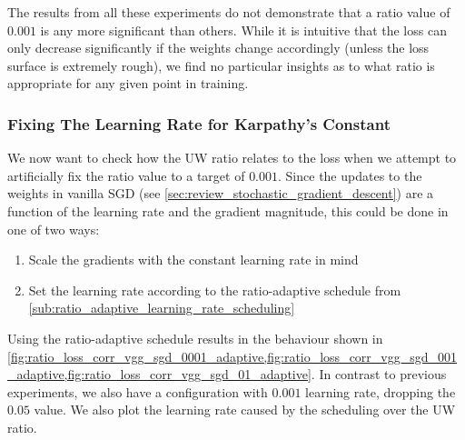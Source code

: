The results from all these experiments do not demonstrate that a ratio value
of $0.001$ is any more significant than others. While it is intuitive that the loss
can only decrease significantly if the weights change accordingly (unless the
loss surface is extremely rough), we find no particular insights as to what
ratio is appropriate for any given point in training.

\subsubsection{Fixing The Learning Rate for Karpathy's Constant}

We now want to check how the UW ratio relates to the loss when we attempt to
artificially fix the ratio value to a target of $0.001$. Since the updates to the
weights in vanilla SGD (see \cref{sec:review_stochastic_gradient_descent}) are a
function of the learning rate and the gradient magnitude, this could be done in
one of two ways:
\begin{enumerate}
    \item Scale the gradients with the constant learning rate in mind
    \item Set the learning rate according to the ratio-adaptive schedule from
        \cref{sub:ratio_adaptive_learning_rate_scheduling}
\end{enumerate}

Using the ratio-adaptive schedule results in the behaviour shown in
\cref{fig:ratio_loss_corr_vgg_sgd_0001_adaptive,fig:ratio_loss_corr_vgg_sgd_001_adaptive,fig:ratio_loss_corr_vgg_sgd_01_adaptive}.
In contrast to previous experiments, we also have a configuration with $0.001$
learning rate, dropping the $0.05$ value. We also plot the learning rate caused
by the scheduling over the UW ratio.

